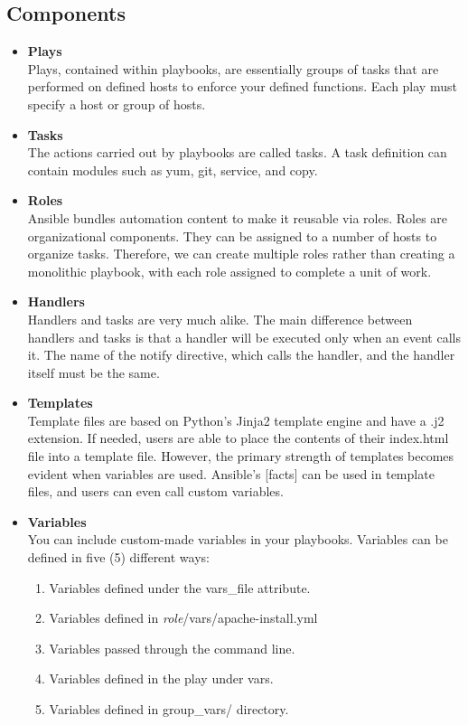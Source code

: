 \documentclass[a4paper, 12pt]{article}
\begin{document}
\subsection{Components}
\begin{itemize}
\item
\textbf{Plays}\\
Plays, contained within playbooks, are essentially groups of tasks that are performed on defined hosts to enforce your defined functions. Each play must specify a host or group of hosts. 
\item
\textbf{Tasks}\\
The actions carried out by playbooks are called tasks. A task definition can contain modules such as yum, git, service, and copy.
\item
\textbf{Roles}\\
Ansible bundles automation content to make it reusable via roles. Roles are organizational components. They can be assigned to a number of hosts to organize tasks. Therefore, we can create multiple roles rather than creating a monolithic playbook, with each role assigned to complete a unit of work.
\item
\textbf{Handlers}\\
Handlers and tasks are very much alike. The main difference between handlers and tasks is that a handler will be executed only when an event calls it. The name of the notify directive, which calls the handler, and the handler itself must be the same. 
\item
\textbf{Templates}\\
Template files are based on Python's Jinja2 template engine and have a .j2 extension. If needed, users are able to place the contents of their index.html file into a template file. However, the primary strength of templates  becomes evident when variables are used. Ansible's [facts] can be used in template files, and users can even call custom variables.
\item
\textbf{Variables}\\
You can include custom-made variables in your playbooks. Variables can be defined in five (5) different ways:
\begin{enumerate}
\item
Variables defined under the vars\_file attribute.
\item
Variables defined in \textit{role}/vars/apache-install.yml
\item
Variables passed through the command line.
\item
Variables defined in the play under vars.
\item
Variables defined in group\_vars/ directory.
\end{enumerate}
\end{itemize}
\end{document}
